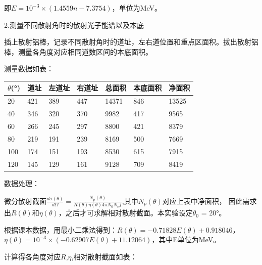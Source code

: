 \documentclass[font=default]{mpltx}
\begin{document}
即$E = {10}^{-3} \times (1.4559n - 7.3754)$，单位为MeV。

2.测量不同散射角时的散射光子能谱以及本底

插上散射铝棒，记录不同散射角时的道址，左右道位置和重点区面积。拔出散射铝棒，测量各角度对应相同道数区间的本底面积。

测量数据如表：

\begin{table}[!ht]
    \centering
    \begin{tabular}{|l|l|l|l|l|l|l|}
    \hline
$\theta$(°)                & 道址                 &左道址            &右道址            &总面积     &本底面积    &净面积 \\ \hline
20                   & 421                  &389                &447            &14371     &846        &13525 \\ \hline
40                   & 346                   &320                &370           &9982      &417        &9565 \\ \hline
60                   & 266                   &245                &297           &8800      &421        &8379  \\ \hline
80                   & 219                  &191                  &239          &8169      &500        &7669  \\ \hline
100                  & 174                  &151                 &193           &8530      &615        &7915  \\ \hline
120                  &145                   &129                 &161           &9128      &709        &8419  \\ \hline
    \end{tabular}
\end{table}

数据处理：

微分散射截面$\frac{d \sigma (\theta)}{d \Omega} = \frac{N_p(\theta)}{R(\theta)\eta(\theta)4 \pi N_0 N_e f}$,其中$N_p(\theta)$对应上表中净面积，
因此需求出$R(\theta)$和$\eta(\theta)$，之后才可求解相对散射截面。本实验设定$\theta_0$ = 20°。

根据课本数据，用最小二乘法得到：$R(\theta) =-0.71828 E(\theta) + 0.918046$，
$\eta(\theta) = 10^{-3} \times (-0.62907E(\theta) + 11.12064)$，其中E单位为MeV。

计算得各角度对应$R$,$\eta$,相对散射截面如表：
\end{document}
